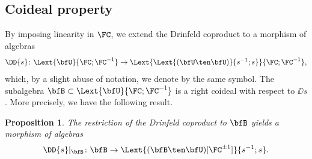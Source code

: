 \documentclass[reqno]{amsart}
\numberwithin{equation}{section}
\newtheorem*{proposition}{Proposition}
\begin{document}
\subsection{Coideal property}\label{ss:coideal}
By imposing linearity in $\FC$, we extend the Drinfeld coproduct
to a morphism of algebras
\begin{align}
	\DD{s}\colon\Lext{\bfU}{\FC;\FC^{-1}}\to\Lext{\Lext{(\bfU\ten\bfU)}{s^{-1};s}}{\FC;\FC^{-1}},
\end{align}
which, by a slight abuse of notation, we denote by the same symbol.
The subalgebra $\bfB\subset\Lext{\bfU}{\FC;\FC^{-1}}$ is a right coideal with respect to $\DD{s}$. More precisely, we have the following result.

\begin{proposition}
	The restriction of the Drinfeld coproduct to $\bfB$ yields a morphism of algebras
	\begin{equation}
		\DD{s}\vert_{\bfB}\colon\bfB\to\Lext{(\bfB\ten\bfU)[\FC^{\pm1}]}{s^{-1};s}.
	\end{equation}	
\end{proposition}
\end{document}
